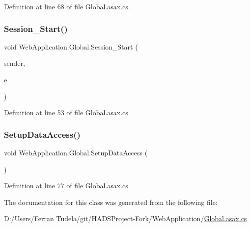 Definition at line 68 of file Global.\+asax.\+cs.

\mbox{\label{classWebApplication_1_1Global_ab2e5cb6155c6759fc0d1a87d7df1668c}} 
\subsubsection{\texorpdfstring{Session\_Start()}{Session\_Start()}}
{\footnotesize\ttfamily void Web\+Application.\+Global.\+Session\+\_\+\+Start (\begin{DoxyParamCaption}\item[{object}]{sender,  }\item[{Event\+Args}]{e }\end{DoxyParamCaption})\hspace{0.3cm}{\ttfamily [protected]}}



Definition at line 53 of file Global.\+asax.\+cs.

\mbox{\label{classWebApplication_1_1Global_a51f7c694be3dcc6ebd0a1ed4d6b6c337}} 
\subsubsection{\texorpdfstring{SetupDataAccess()}{SetupDataAccess()}}
{\footnotesize\ttfamily void Web\+Application.\+Global.\+Setup\+Data\+Access (\begin{DoxyParamCaption}{ }\end{DoxyParamCaption})\hspace{0.3cm}{\ttfamily [protected]}}



Definition at line 77 of file Global.\+asax.\+cs.



The documentation for this class was generated from the following file\+:\begin{DoxyCompactItemize}
\item 
D\+:/\+Users/\+Ferran Tudela/git/\+H\+A\+D\+S\+Project-\/\+Fork/\+Web\+Application/\mbox{\hyperlink{Global_8asax_8cs}{Global.\+asax.\+cs}}\end{DoxyCompactItemize}
